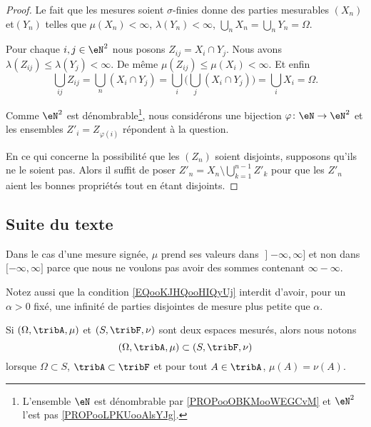 \begin{proof}
	Le fait que les mesures soient \( \sigma\)-finies donne des parties mesurables \( (X_n)\) et\( (Y_n)\) telles que \( \mu(X_n)<\infty\), \( \lambda(Y_n)<\infty\), \( \bigcup_nX_n=\bigcup_nY_n=\Omega\).

	Pour chaque \( i,j\in \eN^2\) nous posons \( Z_{ij}=X_i\cap Y_j\). Nous avons \( \lambda(Z_{ij})\leq \lambda(Y_j)<\infty\). De même \( \mu(Z_{ij})\leq \mu(X_i)<\infty\). Et enfin
	\begin{equation}
		\bigcup_{ij}Z_{ij}=\bigcup_n(X_i\cap Y_j)=\bigcup_i\Big( \bigcup_j(X_i\cap Y_j) \Big)=\bigcup_i X_i=\Omega.
	\end{equation}

	Comme \( \eN^2\) est dénombrable\footnote{L'ensemble \( \eN\) est dénombrable par \ref{PROPooOBKMooWEGCvM} et \( \eN^2\) l'est pas \ref{PROPooLPKUooAlsYJg}.}, nous considérons une bijection \(\varphi \colon \eN\to \eN^2  \) et les ensembles \( Z'_i=Z_{\varphi(i)}\) répondent à la question.

	En ce qui concerne la possibilité que les \( (Z_n)\) soient disjoints, supposons qu'ils ne le soient pas. Alors il suffit de poser \( Z'_n=X_n\setminus \bigcup_{k=1}^{n-1}Z'_k\) pour que les \( Z'_n\) aient les bonnes propriétés tout en étant disjoints.
\end{proof}

\subsection{Suite du texte}


\begin{normaltext}
	Dans le cas d'une mesure signée, \( \mu\) prend ses valeurs dans \( \mathopen] -\infty,\infty\mathclose]\) et non dans \( \mathopen[ -\infty,\infty\mathclose]\) parce que nous ne voulons pas avoir des sommes contenant \( \infty-\infty\).

	Notez aussi que la condition \eqref{EQooKJHQooHIQyUj} interdit d'avoir, pour un \( \alpha>0\) fixé, une infinité de parties disjointes de mesure plus petite que \( \alpha\).
\end{normaltext}

Si \( (\Omega,\tribA,\mu)\) et \( (S,\tribF,\nu)\) sont deux espaces mesurés, alors nous notons
\begin{equation}
	(\Omega,\tribA,\mu)\subset (S,\tribF,\nu)
\end{equation}
lorsque \( \Omega\subset S\), \( \tribA\subset\tribF\) et pour tout \( A\in\tribA\), \( \mu(A)=\nu(A)\).

